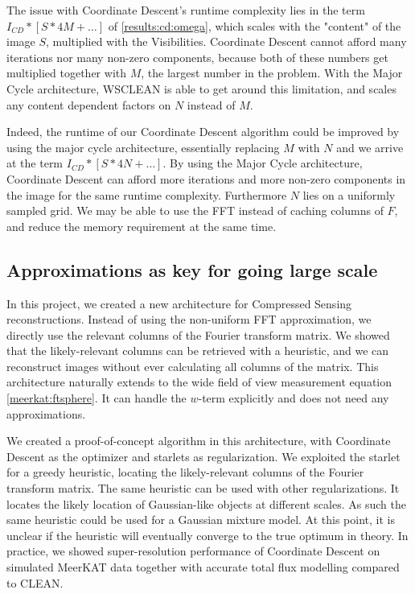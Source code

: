 The issue with Coordinate Descent's runtime complexity lies in the term $I_{CD} * [S * 4M +\ldots]$ of \eqref{results:cd:omega}, which scales with the "content" of the image $S$, multiplied with the Visibilities. Coordinate Descent cannot afford many iterations nor many non-zero components, because both of these numbers get multiplied together with $M$, the largest number in the problem. With the Major Cycle architecture, WSCLEAN is able to get around this limitation, and scales any content dependent factors on $N$ instead of $M$. 

Indeed, the runtime of our Coordinate Descent algorithm could be improved by using the major cycle architecture, essentially replacing $M$ with $N$ and we arrive at the term $I_{CD} * [S * 4N +\ldots]$. By using the Major Cycle architecture, Coordinate Descent can afford more iterations and more non-zero components in the image for the same runtime complexity. Furthermore $N$ lies on a uniformly sampled grid. We may be able to use the FFT instead of caching columns of $F$, and reduce the memory requirement at the same time.


\subsection{Approximations as key for going large scale}
In this project, we created a new architecture for Compressed Sensing reconstructions. Instead of using the non-uniform FFT approximation, we directly use the relevant columns of the Fourier transform matrix. We showed that the likely-relevant columns can be retrieved with a heuristic, and we can reconstruct images without ever calculating all columns of the matrix. This architecture naturally extends to the wide field of view measurement equation \eqref{meerkat:ftsphere}. It can handle the $w$-term explicitly and does not need any approximations. 

We created a proof-of-concept algorithm in this architecture, with Coordinate Descent as the optimizer and starlets as regularization. We exploited the starlet for a greedy heuristic, locating the likely-relevant columns of the Fourier transform matrix. The same heuristic can be used with other regularizations. It locates the likely location of Gaussian-like objects at different scales. As such the same heuristic could be used for a Gaussian mixture model. At this point, it is unclear if the heuristic will eventually converge to the true optimum in theory. In practice, we showed super-resolution performance of Coordinate Descent on simulated MeerKAT data together with accurate total flux modelling compared to CLEAN. 

